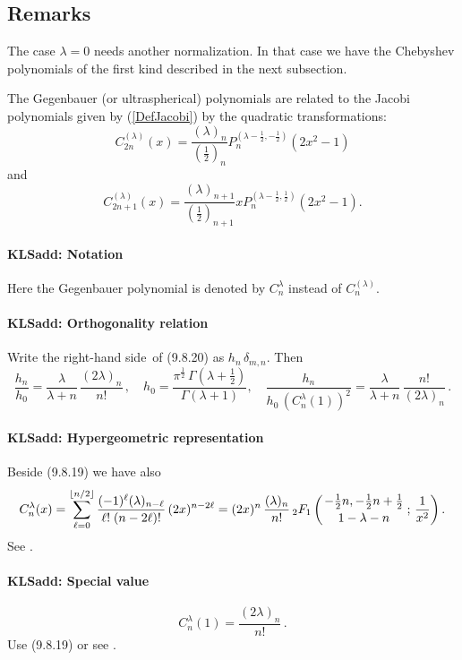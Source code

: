 \documentclass[envcountchap,graybox]{svmono}
\newcommand{\hyp}[5]{\mbox{}_{#1}{F}_{#2}
\left(\genfrac{}{}{0pt}{}{#3}{#4}\,;\,#5\right)}
\renewcommand{\Gamma}{\varGamma}
\newcommand\de\delta
\newcommand\la\lambda
\newcommand\Ga{\Gamma}
\newcommand\half{\frac12}
\newcommand\thalf{\tfrac12}
\newcommand{\hyp}[5]{\,\mbox{}_{#1}F_{#2}\!\left(
  \genfrac{}{}{0pt}{}{#3}{#4};#5\right)}
\newcommand\RHS{right-hand side}
\begin{document}
\subsection*{Remarks}
The case $\lambda=0$ needs another normalization. In that case we have the
Chebyshev polynomials of the first kind described in the next subsection.

\noindent
The Gegenbauer (or ultraspherical) polynomials are related to the Jacobi polynomials
given by (\ref{DefJacobi}) by the quadratic transformations:
$$C_{2n}^{(\lambda)}(x)=\frac{(\lambda)_n}{(\frac{1}{2})_n}
P_n^{(\lambda-\frac{1}{2},-\frac{1}{2})}(2x^2-1)$$
and
$$C_{2n+1}^{(\lambda)}(x)=\frac{(\lambda)_{n+1}}{(\frac{1}{2})_{n+1}}
xP_n^{(\lambda-\frac{1}{2},\frac{1}{2})}(2x^2-1).$$
%
\paragraph{\large\bf KLSadd: Notation}Here the Gegenbauer polynomial is denoted by $C_n^\la$ instead of $C_n^{(\la)}$.
%
\paragraph{\large\bf KLSadd: Orthogonality relation}Write the \RHS\ of (9.8.20) as $h_n\,\de_{m,n}$. Then
\begin{equation}
\frac{h_n}{h_0}=
\frac\la{\la+n}\,\frac{(2\la)_n}{n!}\,,\quad
h_0=\frac{\pi^\half\,\Ga(\la+\thalf)}{\Ga(\la+1)},\quad
\frac{h_n}{h_0\,(C_n^\la(1))^2}=
\frac\la{\la+n}\,\frac{n!}{(2\la)_n}\,.
\label{61}
\end{equation}
%
\paragraph{\large\bf KLSadd: Hypergeometric representation}Beside (9.8.19) we have also
\begin{equation}
C_n^\lambda(x)=\sum_{\ell=0}^{\lfloor n/2\rfloor}\frac{(-1)^{\ell}(\lambda)_{n-\ell}}
{\ell!\;(n-2\ell)!}\,(2x)^{n-2\ell}
=(2x)^{n}\,\frac{(\lambda)_{n}}{n!}\,
\hyp21{-\thalf n,-\thalf n+\thalf}{1-\la-n}{\frac1{x^2}}.
\label{57}
\end{equation}
See .
%
\paragraph{\large\bf KLSadd: Special value}\begin{equation}
C_n^{\la}(1)=\frac{(2\la)_n}{n!}\,.
\label{49}
\end{equation}
Use (9.8.19) or see .
%
\end{document}
